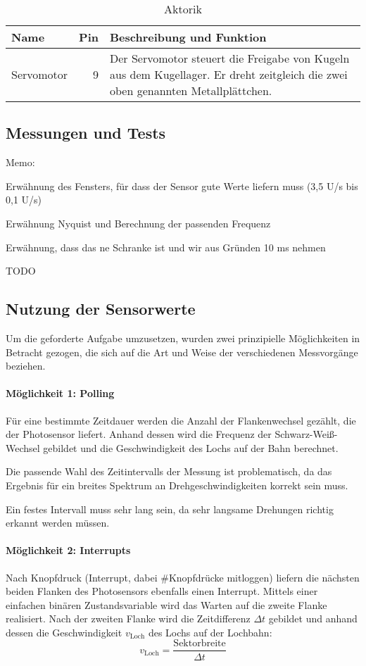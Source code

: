 \documentclass[11pt,a4paper]{scrartcl}
\newcommand{\tablewidth}{.9\textwidth}
\begin{document}
\begin{table}[h]
	\centering
	\begin{tabularx}{\tablewidth}{|l|r|X|}
		\hline
		\bfseries Name & \bfseries Pin & \bfseries Beschreibung und Funktion\\\hline\hline
		Servomotor & 9 & Der Servomotor steuert die Freigabe von Kugeln aus dem Kugellager. Er dreht zeitgleich die zwei oben genannten Metallplättchen.\\\hline
	\end{tabularx}
	\caption{Aktorik}
\end{table}
\subsection{Messungen und Tests}
Memo:
\begin{compactitem}
\item Erwähnung des Fensters, für dass der Sensor gute Werte liefern muss (3,5 U/s bis 0,1 U/s)
\item Erwähnung Nyquist und Berechnung der passenden Frequenz
\item Erwähnung, dass das ne Schranke ist und wir aus Gründen 10 ms nehmen
\end{compactitem}
TODO %
\subsection{Nutzung der Sensorwerte}
Um die geforderte Aufgabe umzusetzen, wurden zwei prinzipielle Möglichkeiten in Betracht gezogen, die sich auf die Art und Weise der verschiedenen Messvorgänge beziehen.
\paragraph{Möglichkeit 1: Polling} Für eine bestimmte Zeitdauer werden die Anzahl der Flankenwechsel gezählt, die der Photosensor liefert. Anhand dessen wird die Frequenz der Schwarz-Weiß-Wechsel gebildet und die Geschwindigkeit des Lochs auf der Bahn berechnet.
\begin{compactitem}
\item Die passende Wahl des Zeitintervalls der Messung ist problematisch, da das Ergebnis für ein breites Spektrum an Drehgeschwindigkeiten korrekt sein muss.
\item Ein festes Intervall muss sehr lang sein, da sehr langsame Drehungen richtig erkannt werden müssen.
\end{compactitem}
\paragraph{Möglichkeit 2: Interrupts} Nach Knopfdruck (Interrupt, dabei \#Knopfdrücke mitloggen) liefern die nächsten beiden Flanken des Photosensors ebenfalls einen Interrupt. Mittels einer einfachen binären Zustandsvariable wird das Warten auf die zweite Flanke realisiert. Nach der zweiten Flanke wird die Zeitdifferenz $\Delta t$ gebildet und anhand dessen die Geschwindigkeit $v_\text{Loch}$ des Lochs auf der Lochbahn: \[v_{\text{Loch}} = \frac{\text{Sektorbreite}}{\Delta t}\]
\end{document}
